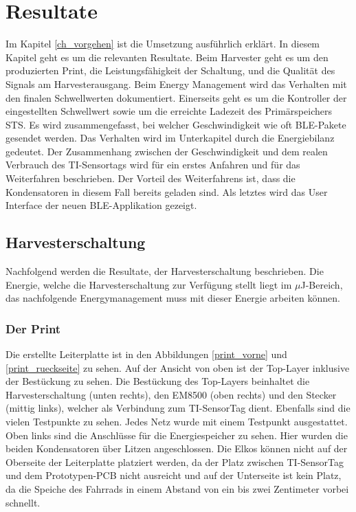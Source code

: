 \chapter{Resultate}
\label{ch_resultat}

Im Kapitel \ref{ch_vorgehen} ist die Umsetzung ausführlich erklärt. In diesem Kapitel geht es um die relevanten Resultate. Beim Harvester geht es um den produzierten Print, die Leistungsfähigkeit der Schaltung, und die Qualität des Signals am Harvesterausgang. Beim Energy Management wird das Verhalten mit den finalen Schwellwerten dokumentiert. Einerseits geht es um die Kontroller der eingestellten Schwellwert sowie um die erreichte Ladezeit des Primärspeichers STS. Es wird zusammengefasst, bei welcher Geschwindigkeit wie oft BLE-Pakete gesendet werden. Das Verhalten wird im Unterkapitel durch die Energiebilanz gedeutet. Der Zusammenhang zwischen der Geschwindigkeit und dem realen Verbrauch des TI-Sensortags wird für ein erstes Anfahren und für das Weiterfahren beschrieben. Der Vorteil des Weiterfahrens ist, dass die Kondensatoren in diesem Fall bereits geladen sind. Als letztes wird das User Interface der neuen BLE-Applikation gezeigt.
 
\section{Harvesterschaltung}

Nachfolgend werden die Resultate, der Harvesterschaltung beschrieben. Die Energie, welche die Harvesterschaltung zur Verfügung stellt liegt im $\mu$J-Bereich, das nachfolgende Energymanagement muss mit dieser Energie arbeiten können.

\subsection{Der Print}

Die erstellte Leiterplatte ist in den Abbildungen \ref{print_vorne} und \ref{print_rueckseite} zu sehen. Auf der Ansicht von oben ist der Top-Layer inklusive der Bestückung zu sehen. Die Bestückung des Top-Layers beinhaltet die Harvesterschaltung (unten rechts), den EM8500 (oben rechts) und den Stecker (mittig links), welcher als Verbindung zum TI-SensorTag dient. Ebenfalls sind die vielen Testpunkte zu sehen. Jedes Netz wurde mit einem Testpunkt ausgestattet. Oben links sind die Anschlüsse für die Energiespeicher zu sehen. Hier wurden die beiden Kondensatoren über Litzen angeschlossen. Die Elkos können nicht auf der Oberseite der Leiterplatte platziert werden, da der Platz zwischen TI-SensorTag und dem Prototypen-PCB nicht ausreicht und auf der Unterseite ist kein Platz, da die Speiche des Fahrrads in einem Abstand von ein bis zwei Zentimeter vorbei schnellt. 

